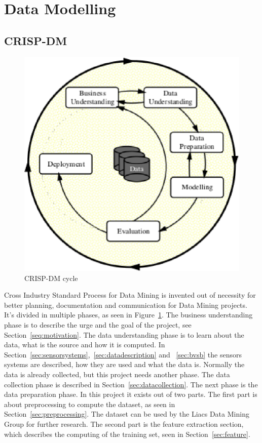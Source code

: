 \section{Data Modelling}
	\subsection{CRISP-DM}
	\label{sec:datamodeling}
	\begin{figure}[h]
		\centering
		\includegraphics[scale=0.75]{crispdm.eps}
					
		\caption{CRISP-DM\cite{wirth2000crisp} cycle}
		\label{fig:crispdm}

	\end{figure}
	Cross Industry Standard Process for Data Mining\cite{wirth2000crisp} is invented out of necessity for better planning, documentation and communication for Data Mining projects. It's divided in multiple phases, as seen in Figure~\ref{fig:crispdm}. The business understanding phase is to describe the urge and the goal of the project, see Section~\ref{seq:motivation}. The data understanding phase is to learn about the data, what is the source and how it is computed. In Section~\ref{sec:sensorsystems},~\ref{sec:datadescription} and ~\ref{sec:bvsb} the sensors systems are described, how they are used and what the data is. Normally the data is already collected, but this project needs another phase. The data collection phase is described in Section~\ref{sec:datacollection}. The next phase is the data preparation phase. In this project it exists out of two parts. The first part is about preprocessing to compute the dataset, as seen in Section~\ref{sec:preprocessing}. The dataset can be used by the Liacs Data Mining Group for further research. The second part is the feature extraction section, which describes the computing of the training set, seen in Section~\ref{sec:feature}. 

